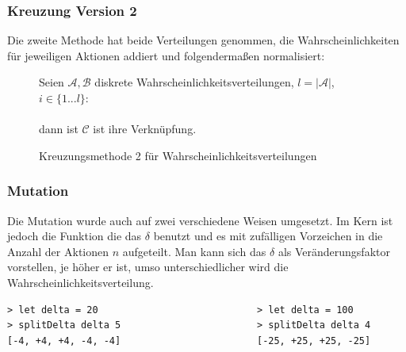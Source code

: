             \subsubsection*{Kreuzung Version 2}
            Die zweite Methode hat beide Verteilungen genommen, die Wahrscheinlichkeiten für jeweiligen Aktionen addiert und folgendermaßen normalisiert:\\
            \noindent
            \begin{figure}[H]
                \begin{mdframed}
                    Seien $\mathcal{A, B}$ diskrete Wahrscheinlichkeitsverteilungen, $l = |\mathcal{A}|$, $i \in \{1 ... l\}$:\\[4mm]
                    \hspace*{40mm} \\[4mm]
                    dann ist $\mathcal{C}$ ist ihre Verknüpfung.
                \end{mdframed}
                \caption{\label{norm-prop} Kreuzungsmethode 2 für Wahrscheinlichkeitsverteilungen}
            \end{figure}

            \subsubsection*{Mutation}
            Die Mutation wurde auch auf zwei verschiedene Weisen umgesetzt. Im Kern ist jedoch die Funktion die das $\delta$ benutzt und es mit zufälligen Vorzeichen in die Anzahl der Aktionen $n$ aufgeteilt. Man kann sich das $\delta$ als Veränderungsfaktor vorstellen, je höher er ist, umso unterschiedlicher wird die Wahrscheinlichkeitsverteilung.
            \begin{mdframed}
                \begin{verbatim}
> let delta = 20                            > let delta = 100
> splitDelta delta 5                        > splitDelta delta 4
[-4, +4, +4, -4, -4]                        [-25, +25, +25, -25]
                \end{verbatim}
            \end{mdframed}

